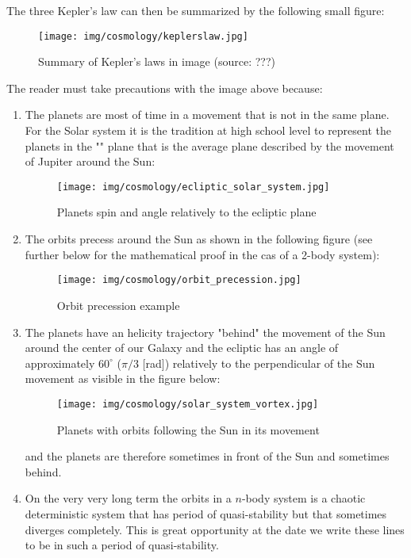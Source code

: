 	The three Kepler's law can then be summarized by the following small figure:
	\begin{figure}[H]
		\begin{center}
		\texttt{[image: img/cosmology/keplerslaw.jpg]}
		\end{center}	
		\caption[Summary of Kepler's laws in image]{Summary of Kepler's laws in image (source: ???)}
	\end{figure}
	
	The reader must take precautions with the image above because:
	\begin{enumerate}
		\item The planets are most of time in a movement that is not in the same plane. For the Solar system it is the tradition  at high school level to represent the planets in the "" plane that is the average plane described by the movement of Jupiter around the Sun:
		\begin{figure}[H]
			\begin{center}
			\texttt{[image: img/cosmology/ecliptic\_solar\_system.jpg]}
			\end{center}	
			\caption{Planets spin and angle relatively to the ecliptic plane}
		\end{figure}
		
		\item The orbits precess around the Sun as shown in the following figure (see further below for the mathematical proof in the cas of a 2-body system):
		\begin{figure}[H]
			\begin{center}
			\texttt{[image: img/cosmology/orbit\_precession.jpg]}
			\end{center}	
			\caption{Orbit precession example}
		\end{figure}
		
		\item The planets have an helicity trajectory "behind" the movement of the Sun around the center of our Galaxy and the ecliptic has an angle of approximately $60^\circ$ ($\pi/3$ [rad]) relatively to the perpendicular of the Sun movement as visible in the figure below:
		\begin{figure}[H]
			\begin{center}
			\texttt{[image: img/cosmology/solar\_system\_vortex.jpg]}
			\end{center}	
			\caption{Planets with orbits following the Sun in its movement}
		\end{figure}
		and the planets are therefore sometimes in front of the Sun and sometimes behind.
		
		\item On the very very long term the orbits in a $n$-body system is a chaotic deterministic system that has period of quasi-stability but that sometimes diverges completely. This is great opportunity at the date we write these lines to be in such a period of quasi-stability.
	\end{enumerate}	
		
